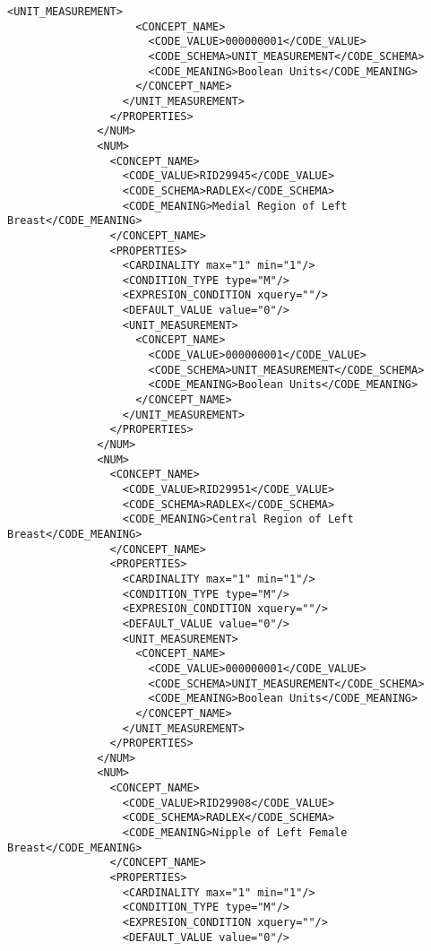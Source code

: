 \begin{lstlisting}[label=dicom-template,caption=Plantilla de un informe estructurado de una exploración de mama]
                  <UNIT_MEASUREMENT>
                    <CONCEPT_NAME>
                      <CODE_VALUE>000000001</CODE_VALUE>
                      <CODE_SCHEMA>UNIT_MEASUREMENT</CODE_SCHEMA>
                      <CODE_MEANING>Boolean Units</CODE_MEANING>
                    </CONCEPT_NAME>
                  </UNIT_MEASUREMENT>
                </PROPERTIES>
              </NUM>
              <NUM>
                <CONCEPT_NAME>
                  <CODE_VALUE>RID29945</CODE_VALUE>
                  <CODE_SCHEMA>RADLEX</CODE_SCHEMA>
                  <CODE_MEANING>Medial Region of Left Breast</CODE_MEANING>
                </CONCEPT_NAME>
                <PROPERTIES>
                  <CARDINALITY max="1" min="1"/>
                  <CONDITION_TYPE type="M"/>
                  <EXPRESION_CONDITION xquery=""/>
                  <DEFAULT_VALUE value="0"/>
                  <UNIT_MEASUREMENT>
                    <CONCEPT_NAME>
                      <CODE_VALUE>000000001</CODE_VALUE>
                      <CODE_SCHEMA>UNIT_MEASUREMENT</CODE_SCHEMA>
                      <CODE_MEANING>Boolean Units</CODE_MEANING>
                    </CONCEPT_NAME>
                  </UNIT_MEASUREMENT>
                </PROPERTIES>
              </NUM>
              <NUM>
                <CONCEPT_NAME>
                  <CODE_VALUE>RID29951</CODE_VALUE>
                  <CODE_SCHEMA>RADLEX</CODE_SCHEMA>
                  <CODE_MEANING>Central Region of Left Breast</CODE_MEANING>
                </CONCEPT_NAME>
                <PROPERTIES>
                  <CARDINALITY max="1" min="1"/>
                  <CONDITION_TYPE type="M"/>
                  <EXPRESION_CONDITION xquery=""/>
                  <DEFAULT_VALUE value="0"/>
                  <UNIT_MEASUREMENT>
                    <CONCEPT_NAME>
                      <CODE_VALUE>000000001</CODE_VALUE>
                      <CODE_SCHEMA>UNIT_MEASUREMENT</CODE_SCHEMA>
                      <CODE_MEANING>Boolean Units</CODE_MEANING>
                    </CONCEPT_NAME>
                  </UNIT_MEASUREMENT>
                </PROPERTIES>
              </NUM>
              <NUM>
                <CONCEPT_NAME>
                  <CODE_VALUE>RID29908</CODE_VALUE>
                  <CODE_SCHEMA>RADLEX</CODE_SCHEMA>
                  <CODE_MEANING>Nipple of Left Female Breast</CODE_MEANING>
                </CONCEPT_NAME>
                <PROPERTIES>
                  <CARDINALITY max="1" min="1"/>
                  <CONDITION_TYPE type="M"/>
                  <EXPRESION_CONDITION xquery=""/>
                  <DEFAULT_VALUE value="0"/>

\end{lstlisting}
